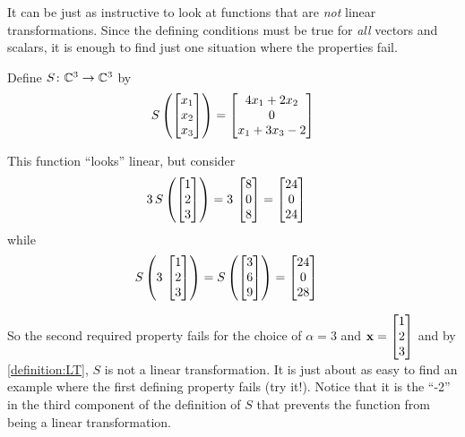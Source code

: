 \documentclass{ximera}
\begin{document}
It can be just as instructive to look at functions that are
\textit{not} linear transformations.  Since the defining conditions
must be true for \textit{all} vectors and scalars, it is enough to
find just one situation where the properties fail.

\begin{example}

Define $S\colon \mathbb{C}^{3}\rightarrow\mathbb{C}^{3}$ by
\[
S\left(\begin{bmatrix}x_1\\x_2\\x_3\end{bmatrix}\right)=\begin{bmatrix}4x_1+2x_2\\0\\x_1+3x_3-2\end{bmatrix}
\]

This function ``looks'' linear, but consider
\begin{align*}
3\,S\left(\begin{bmatrix}1\\2\\3\end{bmatrix}\right)&=3\,\begin{bmatrix}8\\0\\8\end{bmatrix}=\begin{bmatrix}24\\0\\24\end{bmatrix}
\end{align*}
while
\begin{align*}
S\left(3\,\begin{bmatrix}1\\2\\3\end{bmatrix}\right)&=S\left(\begin{bmatrix}3\\6\\9\end{bmatrix}\right)=\begin{bmatrix}24\\0\\28\end{bmatrix}
\end{align*}


So the second required property fails for the choice of $\alpha=3$ and $\mathbf{x}=\begin{bmatrix}1\\2\\3\end{bmatrix}$ and by \ref{definition:LT}, $S$ is not a linear transformation.  It is just about as easy to find an example where the first defining property fails (try it!).  Notice that it is the ``-2'' in the third component of the definition of $S$ that prevents the function from being a linear transformation.

\end{example}
\end{document}
